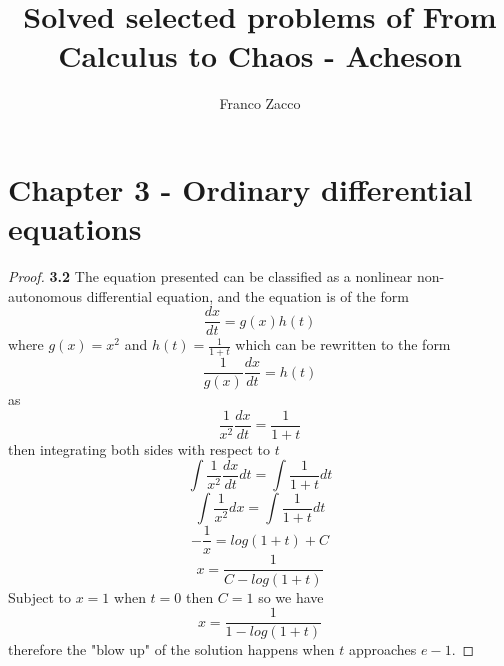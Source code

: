 \documentclass[11pt]{article}
\title{\textbf{Solved selected problems of From Calculus to Chaos - Acheson}}
\author{Franco Zacco}
\date{}
\begin{document}
\maketitle
\thispagestyle{empty}

\section*{Chapter 3 - Ordinary differential equations}

	\begin{proof}{\textbf{3.2}}
		The equation presented can be classified as a nonlinear non-autonomous
		differential equation, and the equation is of the form
		$$\frac{dx}{dt}=g(x)h(t)$$
		where $g(x)=x^{2}$ and $h(t)=\frac{1}{1+t}$ which can be rewritten to
		the form
		$$\frac{1}{g(x)}\frac{dx}{dt}=h(t)$$
		as
		$$\frac{1}{x^{2}}\frac{dx}{dt} = \frac{1}{1+t}$$
		then integrating both sides with respect to $t$
		$$\int \frac{1}{x^2}\frac{dx}{dt}dt = \int \frac{1}{1+t}dt$$
		$$\int \frac{1}{x^2}dx = \int \frac{1}{1+t}dt$$
		$$-\frac{1}{x} = log(1+t) +C$$
		$$x = \frac{1}{C - log(1+t)}$$
		Subject to $x = 1$ when $t = 0$ then $C=1$ so we have
		$$x = \frac{1}{1 - log(1+t)}$$
		therefore the "blow up" of the solution happens when $t$ approaches
		$e-1$.
	\end{proof}
\cleardoublepage
\end{document}
